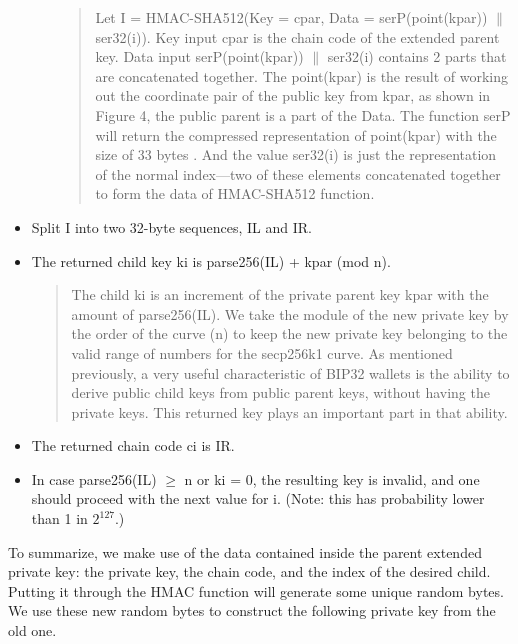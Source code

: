 \begin{adjustwidth}{0.5cm}{}
\begin{itemize}
\begin{itemize}
\begin{quote}
                            Let I = HMAC-SHA512(Key = cpar, Data = serP(point(kpar)) $\parallel$ ser32(i)).
                            Key input cpar is the chain code of the extended parent key. Data input serP(point(kpar)) $\parallel$ ser32(i) contains 2 parts that are concatenated together. The point(kpar) is the result of working out the coordinate pair of the public key from kpar, as shown in Figure 4, the public parent is a part of the Data. The function serP will return the compressed representation of point(kpar) with the size of 33 bytes \cite{secp256k1}. And the value ser32(i) is just the representation of the normal index—two of these elements concatenated together to form the data of HMAC-SHA512 function.
                        \end{quote}

              \end{itemize}
              \bigskip

        \item Split I into two 32-byte sequences, IL and IR.
              \bigskip

        \item The returned child key ki is parse256(IL) + kpar (mod n).

              \begin{quote}
                  The child ki is an increment of the private parent key kpar with the amount of parse256(IL). We take the module of the new private key by the order of the curve (n) to keep the new private key belonging to the valid range of numbers for the secp256k1 curve. As mentioned previously, a very useful characteristic of BIP32 wallets is the ability to derive public child keys from public parent keys, without having the private keys. This returned key plays an important part in that ability.
              \end{quote}
              \bigskip

        \item The returned chain code ci is IR.
              \bigskip

        \item In case parse256(IL) $\geq$ n or ki = 0, the resulting key is invalid, and one should proceed with the next value for i. (Note: this has probability lower than 1 in $2^{127}$.)

    \end{itemize}

    To summarize, we make use of the data contained inside the parent extended private key: the private key, the chain code, and the index of the desired child. Putting it through the HMAC function will generate some unique random bytes. We use these new random bytes to construct the following private key from the old one.


\end{adjustwidth}
